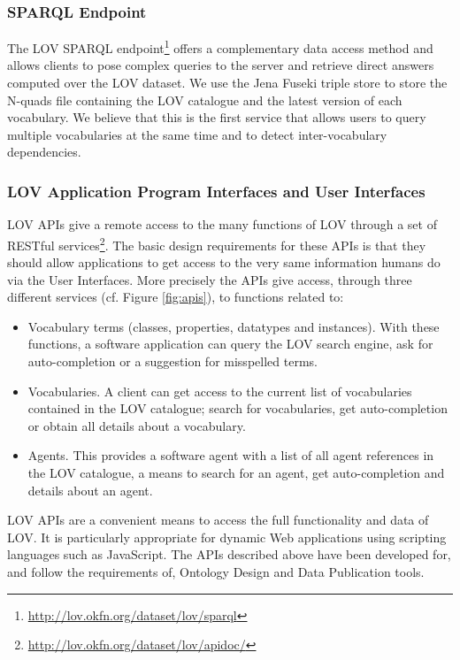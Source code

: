 \documentclass{iosart2c}
\begin{document}
\subsubsection{SPARQL Endpoint}
The LOV SPARQL endpoint\footnote{\url{http://lov.okfn.org/dataset/lov/sparql}} offers a complementary data access method and allows clients to pose complex queries to the server and retrieve direct answers computed over the LOV dataset. We use the Jena Fuseki triple store to store the N-quads file containing the LOV catalogue and the latest version of each vocabulary. We believe that this is the first service that allows users to query multiple vocabularies at the same time and to detect inter-vocabulary dependencies. 

\subsubsection{LOV Application Program Interfaces and User Interfaces}
LOV APIs give a remote access to the many functions of LOV through a set of RESTful services\footnote{\url{http://lov.okfn.org/dataset/lov/apidoc/}}. The basic design requirements for these APIs is that they should allow applications to get access to the very same information humans do via the User Interfaces. More precisely the APIs give access, through three different services (cf. Figure \ref{fig:apis}), to functions related to:
\begin{itemize} 
			\item Vocabulary terms (classes, properties, datatypes and instances). With these functions, a software application can query the LOV search engine, ask for auto-completion or a suggestion for misspelled terms.
			\item Vocabularies. A client can get access to the current list of vocabularies contained in the LOV catalogue; search for vocabularies, get auto-completion or obtain all details about a vocabulary.
			\item Agents. This provides a software agent with a list of all agent references in the LOV catalogue, a means to search for an agent, get auto-completion and details about an agent.
		\end{itemize}
LOV APIs are a convenient means to access the full functionality and data of LOV. It is particularly appropriate for dynamic Web applications using scripting languages such as JavaScript. The APIs described above have been developed for, and follow the requirements of, Ontology Design and Data Publication tools. 
\end{document}
